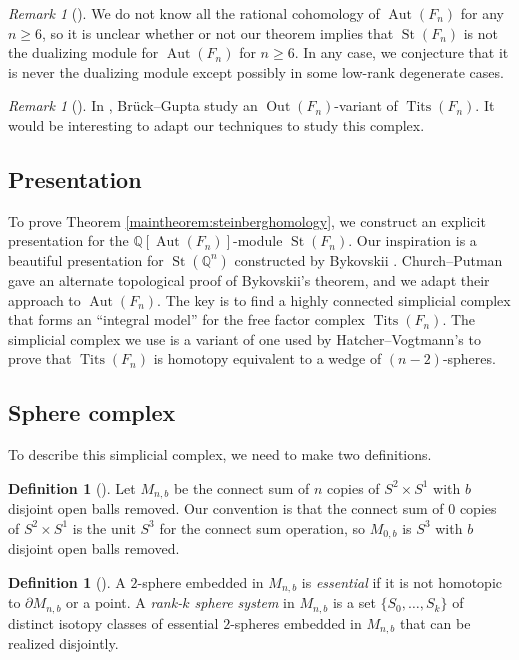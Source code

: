 \documentclass[11pt]{amsart}
\numberwithin{equation}{section}
\theoremstyle{plain}
\theoremstyle{definition}
\newtheorem{defn}[theorem]{Definition}
\newenvironment{definition}[1][]{\begin{defn}[#1]\pushQED{\qed}}{\popQED \end{defn}}
\theoremstyle{remark}
\newtheorem{rmk}[theorem]{Remark}
\newenvironment{remark}[1][]{\begin{rmk}[#1] \pushQED{\qed}}{\popQED \end{rmk}}
\newcommand\Q{\ensuremath{\mathbb{Q}}}
\DeclareMathOperator{\Aut}{Aut}
\DeclareMathOperator{\Out}{Out}
\DeclareMathOperator{\Tits}{Tits}
\DeclareMathOperator{\St}{St}
\begin{document}
\begin{remark}
We do not know all the rational cohomology of $\Aut(F_n)$ for any $n \geq 6$, so it is
unclear whether or not our theorem implies that $\St(F_n)$ is not the dualizing module
for $\Aut(F_n)$ for $n \geq 6$.  In any case, we conjecture that it is never the dualizing
module except possibly in some low-rank degenerate cases.
\end{remark}

\begin{remark}
In \cite{BruckGupta}, Br\"{u}ck--Gupta study an $\Out(F_n)$-variant of $\Tits(F_n)$.
It would be interesting to adapt our techniques to study this complex.
\end{remark}

\subsection{Presentation}
To prove Theorem \ref{maintheorem:steinberghomology}, we construct an explicit presentation
for the $\Q[\Aut(F_n)]$-module $\St(F_n)$.  Our inspiration is a beautiful presentation for
$\St(\Q^n)$ constructed by Bykovskii \cite{Bykovskii}.  Church--Putman \cite{ChurchPutmanCodim1}
gave an alternate topological proof of Bykovskii's theorem, and we adapt their
approach to $\Aut(F_n)$.  The key is to find a highly connected simplicial complex that
forms an ``integral model'' for
the free factor complex $\Tits(F_n)$.  The simplicial complex we use is a variant of one used by Hatcher--Vogtmann's \cite{HatcherVogtmann, HatcherVogtmannRevised}
to prove that $\Tits(F_n)$ is homotopy equivalent to a
wedge of $(n-2)$-spheres.

\subsection{Sphere complex}
To describe this simplicial complex, we need to make two definitions.

\begin{definition}
Let $M_{n,b}$ be the connect sum of $n$ copies of $S^2 \times S^1$ with
$b$ disjoint open balls removed.  Our convention is that the connect sum of
$0$ copies of $S^2 \times S^1$ is the unit $S^3$ for the connect sum operation,
so $M_{0,b}$ is $S^3$ with $b$ disjoint open balls removed.
\end{definition}

\begin{definition}
A $2$-sphere embedded in $M_{n,b}$ is {\em essential} if it is not homotopic to $\partial M_{n,b}$ or a point.
A {\em rank-$k$ sphere system} in $M_{n,b}$ is a set $\{S_0,\ldots,S_k\}$ of distinct isotopy classes of
essential $2$-spheres embedded in $M_{n,b}$ that
can be realized disjointly.
\end{definition}
\end{document}
